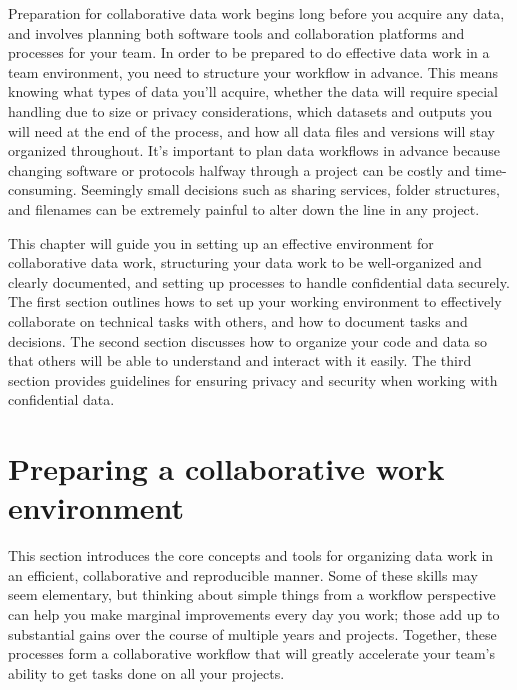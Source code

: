
\begin{fullwidth}
Preparation for collaborative data work begins long before you acquire any data,
and involves planning both software tools and collaboration platforms and processes for your team.
In order to be prepared to do effective data work in a team environment,
you need to structure your workflow in advance.
This means knowing what types of data you'll acquire,
whether the data will require special handling due to size or privacy considerations,
which datasets and outputs you will need at the end of the process,
and how all data files and versions will stay organized throughout.
It's important to plan data workflows in advance because
changing software or protocols halfway through a project can be costly and time-consuming.
Seemingly small decisions such as sharing services, folder structures,
and filenames can be extremely painful to alter down the line in any project.

This chapter will guide you in setting up an effective environment for collaborative data work,
structuring your data work to be well-organized and clearly documented,
and setting up processes to handle confidential data securely.
The first section outlines hows to set up your working environment
to effectively collaborate on technical tasks with others,
and how to document tasks and decisions.
The second section discusses how to organize your code and data so that others
will be able to understand and interact with it easily.
The third section provides guidelines for ensuring
privacy and security when working with confidential data.

\end{fullwidth}


\section{Preparing a collaborative work environment}

This section introduces the core concepts and tools
for organizing data work in an efficient, collaborative and reproducible manner.
Some of these skills may seem elementary,
but thinking about simple things from a workflow perspective
can help you make marginal improvements every day you work;
those add up to substantial gains over the course of multiple years and projects.
Together, these processes form a collaborative workflow
that will greatly accelerate your team's ability to get tasks done
on all your projects.

